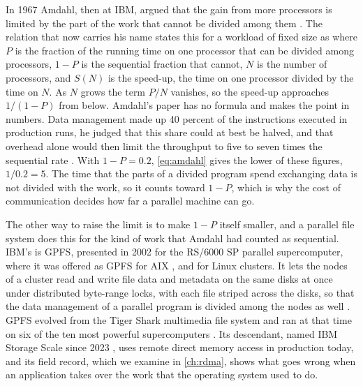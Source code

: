 In 1967 Amdahl, then at IBM, argued that the gain from more processors is
limited by the part of the work that cannot be divided among them
\citep{amdahl1967}. The relation that now carries his name states this for a
workload of fixed size \citep{gustafson1988} as
where $P$ is the fraction of the running time on one processor that can be
divided among processors, $1 - P$ is the sequential fraction that cannot,
$N$ is the number of processors, and $S(N)$ is the speed-up, the time on one
processor divided by the time on $N$. As $N$ grows the term $P/N$ vanishes,
so the speed-up approaches $1/(1 - P)$ from below. Amdahl's paper has no
formula and makes the point in numbers. Data management made up 40 percent
of the instructions executed in production runs, he judged that this share
could at best be halved, and that overhead alone would then limit the
throughput to five to seven times the sequential rate \citep{amdahl1967}.
With $1 - P = 0.2$, \cref{eq:amdahl} gives the lower of these figures,
$1/0.2 = 5$. The time that the parts of a divided program spend exchanging
data is not divided with the work, so it counts toward $1 - P$, which is why
the cost of communication decides how far a parallel machine can go.

The other way to raise the limit is to make $1 - P$ itself smaller, and a
parallel file system does this for the kind of work that Amdahl had counted
as sequential. IBM's is GPFS, presented in 2002 for the RS/6000 SP parallel
supercomputer, where it was offered as GPFS for AIX
\citep{farazdel2001gpfsaix}, and for Linux clusters. It lets the nodes of a cluster read
and write file data and metadata on the same disks at once under distributed
byte-range locks, with each file striped across the disks, so that the data
management of a parallel program is divided among the nodes as well
\citep{schmuck2002gpfs}. GPFS evolved from the Tiger Shark multimedia file
system and ran at that time on six of the ten most powerful supercomputers
\citep{schmuck2002gpfs}. Its descendant, named IBM Storage Scale since 2023
\citep{ibm2023storagebrand}, uses remote direct memory access in production
today, and its field record, which we examine in \cref{ch:rdma}, shows what
goes wrong when an application takes over the work that the operating system
used to do.


